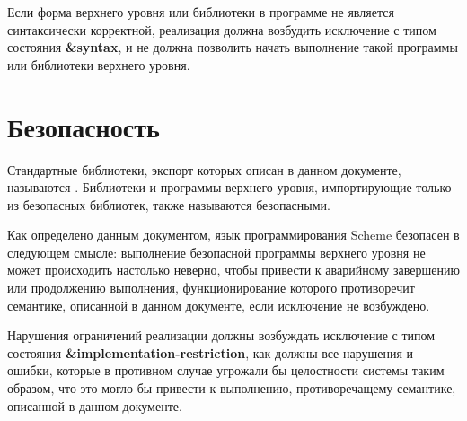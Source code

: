Если форма верхнего уровня или библиотеки в программе не является синтаксически корректной,
реализация должна возбудить исключение с типом состояния {\bfseries\cf\&syntax}, и не должна
позволить начать выполнение такой программы или библиотеки верхнего уровня.\vspace{-2mm}

\section{Безопасность}\vspace{-1mm}
\label{safetysection}

Стандартные библиотеки, экспорт которых описан в данном документе, называются
. Библиотеки и программы верхнего уровня,
импортирующие только из безопасных библиотек, также называются безопасными.

Как определено данным документом, язык программирования Scheme безопасен в
следующем смысле: выполнение безопасной программы верхнего уровня не может происходить
настолько неверно, чтобы привести к аварийному завершению или продолжению выполнения,
функционирование которого противоречит семантике, описанной в данном документе, если исключение
не возбуждено.

Нарушения ограничений реализации должны возбуждать исключение с типом состояния
{\bfseries\cf\&implementation-\hp{}restriction}, как должны все нарушения и ошибки, которые в
противном случае угрожали бы целостности системы таким образом, что это могло бы привести к
выполнению, противоречащему семантике, описанной в данном документе.


